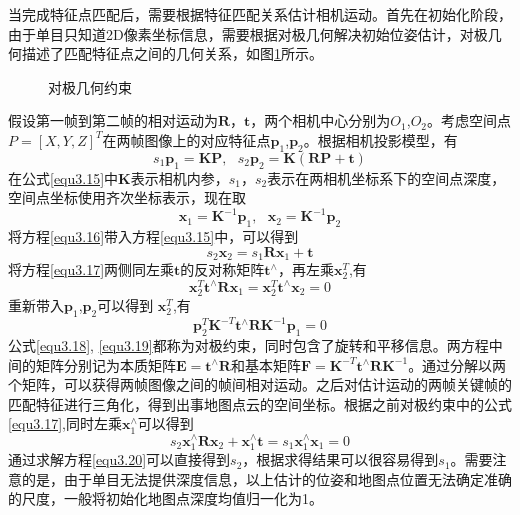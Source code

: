 当完成特征点匹配后，需要根据特征匹配关系估计相机运动。首先在初始化阶段，由于单目只知道2D像素坐标信息，需要根据对极几何解决初始位姿估计，对极几何描述了匹配特征点之间的几何关系，如图\ref{fig3.7}所示。
\begin{figure}
\centering
\caption{对极几何约束}
\label{fig3.7}
\end{figure}
假设第一帧到第二帧的相对运动为$\boldsymbol{R}$，$\boldsymbol{t}$，两个相机中心分别为$O_1$,$O_2$。考虑空间点$P=[X,Y,Z]^T$在两帧图像上的对应特征点$\boldsymbol{p}_1$,$\boldsymbol{p}_2$。根据相机投影模型，有
\begin{equation}
\label{equ3.15}
s_1 \boldsymbol{p}_1 = \boldsymbol{K} \boldsymbol{P}, \ \ \ 
s_2 \boldsymbol{p}_2 = \boldsymbol{K} (\boldsymbol{R} \boldsymbol{P}+\boldsymbol{t})
\end{equation}
在公式\eqref{equ3.15}中$\boldsymbol{K}$表示相机内参，$s_1$，$s_2$表示在两相机坐标系下的空间点深度，空间点坐标使用齐次坐标表示，现在取
\begin{equation}
\label{equ3.16}
\boldsymbol{x}_1 = \boldsymbol{K}^{-1} \boldsymbol{p}_1, \ \ \ 
\boldsymbol{x}_2 = \boldsymbol{K}^{-1} \boldsymbol{p}_2
\end{equation}
将方程\eqref{equ3.16}带入方程\eqref{equ3.15}中，可以得到
\begin{equation}
\label{equ3.17}
s_2 \boldsymbol{x}_2 = s_1 \boldsymbol{R} \boldsymbol{x}_1 + \boldsymbol{t}
\end{equation}
将方程\eqref{equ3.17}两侧同左乘$\boldsymbol{t}$的反对称矩阵$\boldsymbol{t}^{\wedge}$，再左乘$\boldsymbol{x}_2^T$,有
\begin{equation}
\label{equ3.18}
\boldsymbol{x}_2^T  \boldsymbol{t}^{\wedge}  \boldsymbol{R} \boldsymbol{x}_1 = \boldsymbol{x}_2^T \boldsymbol{t}^{\wedge} \boldsymbol{x}_2 = 0
\end{equation}
重新带入$\boldsymbol{p}_1$,$\boldsymbol{p}_2$可以得到
$\boldsymbol{x}_2^T$,有
\begin{equation}
\label{equ3.19}
\boldsymbol{p}_2^T \boldsymbol{K}^{-T} \boldsymbol{t}^{\wedge}  \boldsymbol{R} \boldsymbol{K}^{-1} \boldsymbol{p}_1  = 0
\end{equation}
公式\eqref{equ3.18}, \eqref{equ3.19}都称为对极约束，同时包含了旋转和平移信息。两方程中间的矩阵分别记为本质矩阵$\boldsymbol{E} = \boldsymbol{t}^{\wedge}  \boldsymbol{R} $和基本矩阵$\boldsymbol{F} = \boldsymbol{K}^{-T} \boldsymbol{t}^{\wedge}  \boldsymbol{R} \boldsymbol{K}^{-1}$。通过分解以两个矩阵，可以获得两帧图像之间的帧间相对运动。之后对估计运动的两帧关键帧的匹配特征进行三角化，得到出事地图点云的空间坐标。根据之前对极约束中的公式\eqref{equ3.17},同时左乘$\boldsymbol{x}_1^{\wedge}$可以得到
\begin{equation}
\label{equ3.20}
s_2 \boldsymbol{x}_1^{\wedge} \boldsymbol{R} \boldsymbol{x}_2 + \boldsymbol{x}_1^{\wedge} \boldsymbol{t} = s_1 \boldsymbol{x}_1^{\wedge} \boldsymbol{x}_1 = 0
\end{equation}
通过求解方程\eqref{equ3.20}可以直接得到$s_2$，根据求得结果可以很容易得到$s_1$。需要注意的是，由于单目无法提供深度信息，以上估计的位姿和地图点位置无法确定准确的尺度，一般将初始化地图点深度均值归一化为1。

